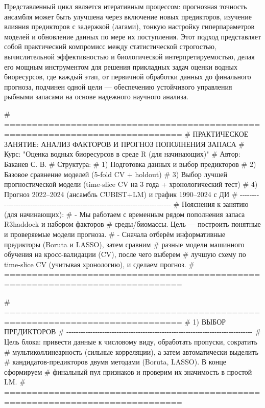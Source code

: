 \documentclass[
  letterpaper,
  DIV=11,
  numbers=noendperiod]{scrreprt}
\newenvironment{Shaded}{\begin{snugshade}}{\end{snugshade}}
\newcommand{\CommentTok}[1]{\textcolor[rgb]{0.37,0.37,0.37}{#1}}
\begin{document}
Представленный цикл является итеративным процессом: прогнозная точность
ансамбля может быть улучшена через включение новых предикторов, изучение
влияния предикторов с задержкой (лагами), тонкую настройку
гиперпараметров моделей и обновление данных по мере их поступления. Этот
подход представляет собой практический компромисс между статистической
строгостью, вычислительной эффективностью и биологической
интерпретируемостью, делая его мощным инструментом для решения
прикладных задач оценки водных биоресурсов, где каждый этап, от
первичной обработки данных до финального прогноза, подчинен одной цели
--- обеспечению устойчивого управления рыбными запасами на основе
надежного научного анализа.

\begin{Shaded}
\begin{Highlighting}[]
\CommentTok{\# ==============================================================================}
\CommentTok{\# ПРАКТИЧЕСКОЕ ЗАНЯТИЕ: АНАЛИЗ ФАКТОРОВ И ПРОГНОЗ ПОПОЛНЕНИЯ ЗАПАСА}
\CommentTok{\# Курс: "Оценка водных биоресурсов в среде R (для начинающих)"}
\CommentTok{\# Автор: Баканев С. В.}
\CommentTok{\# Структура:}
\CommentTok{\# 1) Подготовка данных и выбор предикторов}
\CommentTok{\# 2) Базовое сравнение моделей (5{-}fold CV + holdout)}
\CommentTok{\# 3) Выбор лучшей прогностической модели (time{-}slice CV на 3 года + хронологический тест)}
\CommentTok{\# 4) Прогноз 2022–2024 (ансамбль CUBIST+LM) и график 1990–2024 с ДИ}
\CommentTok{\# {-}{-}{-}{-}{-}{-}{-}{-}{-}{-}{-}{-}{-}{-}{-}{-}{-}{-}{-}{-}{-}{-}{-}{-}{-}{-}{-}{-}{-}{-}{-}{-}{-}{-}{-}{-}{-}{-}{-}{-}{-}{-}{-}{-}{-}{-}{-}{-}{-}{-}{-}{-}{-}{-}{-}{-}{-}{-}{-}{-}{-}{-}{-}{-}{-}{-}{-}{-}{-}{-}{-}{-}{-}{-}{-}{-}{-}{-}}
\CommentTok{\# Пояснения к занятию (для начинающих):}
\CommentTok{\# {-} Мы работаем с временным рядом пополнения запаса R3haddock и набором факторов}
\CommentTok{\#   среды/биомассы. Цель — построить понятные и проверяемые модели прогноза.}
\CommentTok{\# {-} Сначала отберём информативные предикторы (Boruta и LASSO), затем сравним}
\CommentTok{\#   разные модели машинного обучения на кросс{-}валидации (CV), после чего выберем}
\CommentTok{\#   лучшую схему по time{-}slice CV (учитывая хронологию), и сделаем прогноз.}
\CommentTok{\# ==============================================================================}


\CommentTok{\# ==============================================================================}
\CommentTok{\# 1) ВЫБОР ПРЕДИКТОРОВ}
\CommentTok{\# {-}{-}{-}{-}{-}{-}{-}{-}{-}{-}{-}{-}{-}{-}{-}{-}{-}{-}{-}{-}{-}{-}{-}{-}{-}{-}{-}{-}{-}{-}{-}{-}{-}{-}{-}{-}{-}{-}{-}{-}{-}{-}{-}{-}{-}{-}{-}{-}{-}{-}{-}{-}{-}{-}{-}{-}{-}{-}{-}{-}{-}{-}{-}{-}{-}{-}{-}{-}{-}{-}{-}{-}{-}{-}{-}{-}{-}{-}}
\CommentTok{\# Цель блока: привести данные к числовому виду, обработать пропуски, сократить}
\CommentTok{\# мультиколлинеарность (сильные корреляции), а затем автоматически выделить}
\CommentTok{\# кандидатов{-}предикторов двумя методами (Boruta, LASSO). В конце сформируем}
\CommentTok{\# финальный пул признаков и проверим их значимость в простой LM.}
\CommentTok{\# ==============================================================================}


\end{Highlighting}
\end{Shaded}
\end{document}
